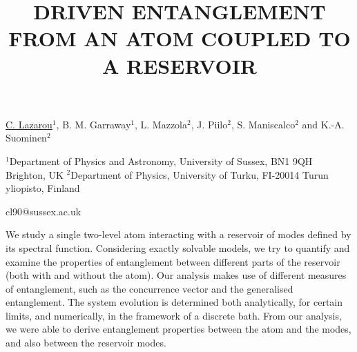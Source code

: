 \title{DRIVEN ENTANGLEMENT FROM AN ATOM COUPLED TO A \mbox{RESERVOIR}}

\underline{C. Lazarou}$^1$, B. M. Garraway$^1$, L. Mazzola$^2$, J.
Piilo$^2$, S. Maniscalco$^2$ and K.-A. Suominen$^2$    
 

{\normalsize{\vspace{-4mm} $^1$Department of Physics and Astronomy, University of
Sussex, BN1 9QH Brighton, UK
 $^2$Department of Physics, University of Turku,
FI-20014 Turun yliopisto, Finland

\email cl90@sussex.ac.uk}}

We study a single two-level atom interacting with a reservoir of modes
defined by its spectral function.  Considering exactly solvable
models, we try to quantify and examine the properties of entanglement
between different parts of the reservoir (both with and without the
atom). Our analysis makes use of different measures of entanglement,
such as the concurrence vector and the generalised entanglement. The
system evolution is determined both analytically, for certain limits,
and numerically, in the framework of a discrete bath. From our
analysis, we were able to derive entanglement properties between the
atom and the modes, and also between the reservoir modes.

\vspace{\baselineskip}
